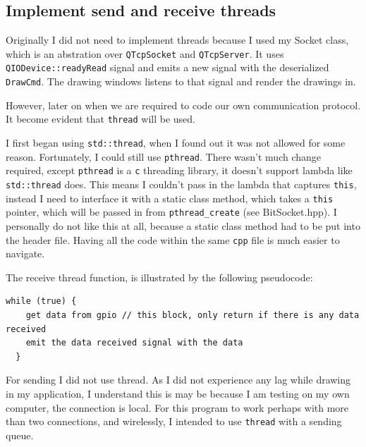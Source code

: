 \documentclass[11pt]{article}
\begin{document}
\begin{multicols*}{2}
\subsection{Implement send and receive threads}


   Originally I did not need to implement threads because I used my Socket class, which is an abstration over \verb|QTcpSocket| and \verb|QTcpServer|. It uses \verb|QIODevice::readyRead| signal and emits a new signal with the deserialized \verb|DrawCmd|. The drawing windows listens to that signal and render the drawings in.

   However, later on when we are required to code our own communication protocol. It become evident that \verb|thread| will be used.

   I first began using \verb|std::thread|, when I found out it was not allowed for some reason. Fortunately, I could still use \verb|pthread|. There wasn't much change required, except \verb|pthread| is a \verb|c| threading library, it doesn't support lambda like \verb|std::thread| does. This means I couldn't pass in the lambda that captures \verb|this|, instead I need to interface it with a static class method, which takes a \verb|this| pointer, which will be passed in from \verb|pthread_create| (see BitSocket.hpp). I personally do not like this at all, because a static class method had to be put into the header file. Having all the code within the same \verb|cpp| file is much easier to navigate.

   The receive thread function, is illustrated by the following pseudocode:
\begin{lstlisting}[caption={receive thread function pseudocode}]
  while (true) {
    get data from gpio // this block, only return if there is any data received
    emit the data received signal with the data
  }
\end{lstlisting}

   For sending I did not use thread. As I did not experience any lag while drawing in my application, I understand this is may be because I am testing on my own computer, the connection is local. For this program to work perhaps with more than two connections, and wirelessly, I intended to use \verb|thread| with a sending queue.


\end{multicols*}
\end{document}
